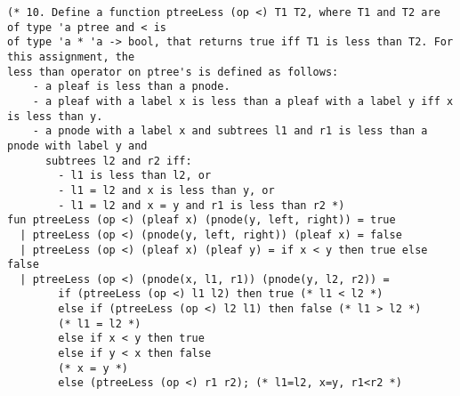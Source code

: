 \documentclass[10pt]{article}
\begin{document}
\begin{verbatim}
(* 10. Define a function ptreeLess (op <) T1 T2, where T1 and T2 are of type 'a ptree and < is
of type 'a * 'a -> bool, that returns true iff T1 is less than T2. For this assignment, the
less than operator on ptree's is defined as follows: 
    - a pleaf is less than a pnode.
    - a pleaf with a label x is less than a pleaf with a label y iff x is less than y.
    - a pnode with a label x and subtrees l1 and r1 is less than a pnode with label y and
      subtrees l2 and r2 iff:
        - l1 is less than l2, or
        - l1 = l2 and x is less than y, or
        - l1 = l2 and x = y and r1 is less than r2 *)
fun ptreeLess (op <) (pleaf x) (pnode(y, left, right)) = true
  | ptreeLess (op <) (pnode(y, left, right)) (pleaf x) = false
  | ptreeLess (op <) (pleaf x) (pleaf y) = if x < y then true else false
  | ptreeLess (op <) (pnode(x, l1, r1)) (pnode(y, l2, r2)) = 
        if (ptreeLess (op <) l1 l2) then true (* l1 < l2 *)
        else if (ptreeLess (op <) l2 l1) then false (* l1 > l2 *)
        (* l1 = l2 *)
        else if x < y then true
        else if y < x then false
        (* x = y *)
        else (ptreeLess (op <) r1 r2); (* l1=l2, x=y, r1<r2 *)
\end{verbatim}
\end{document}

